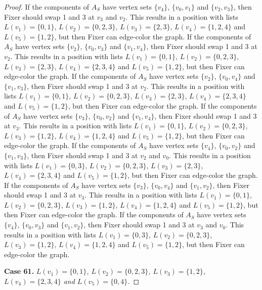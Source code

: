\documentclass[12pt]{amsart}
\theoremstyle{plain}
\theoremstyle{definition}
\theoremstyle{remark}
\begin{document}
\begin{proof}
If the components of $A_S$ have vertex sets $\{v_4\}$, $\{v_0, v_1\}$ and $\{v_2, v_3\}$, then Fixer should swap 1 and 3 at $v_3$ and $v_2$. This results in a position with lists $L(v_1) = \{0, 1\}$, $L(v_2) = \{0, 2, 3\}$, $L(v_3) = \{2, 3\}$, $L(v_4) = \{1, 2, 4\}$ and $L(v_5) = \{1, 2\}$, but then Fixer can edge-color the graph.
If the components of $A_S$ have vertex sets $\{v_2\}$, $\{v_0, v_3\}$ and $\{v_1, v_4\}$, then Fixer should swap 1 and 3 at $v_2$. This results in a position with lists $L(v_1) = \{0, 1\}$, $L(v_2) = \{0, 2, 3\}$, $L(v_3) = \{2, 3\}$, $L(v_4) = \{2, 3, 4\}$ and $L(v_5) = \{1, 2\}$, but then Fixer can edge-color the graph.
If the components of $A_S$ have vertex sets $\{v_2\}$, $\{v_0, v_4\}$ and $\{v_1, v_3\}$, then Fixer should swap 1 and 3 at $v_2$. This results in a position with lists $L(v_1) = \{0, 1\}$, $L(v_2) = \{0, 2, 3\}$, $L(v_3) = \{2, 3\}$, $L(v_4) = \{2, 3, 4\}$ and $L(v_5) = \{1, 2\}$, but then Fixer can edge-color the graph.
If the components of $A_S$ have vertex sets $\{v_3\}$, $\{v_0, v_2\}$ and $\{v_1, v_4\}$, then Fixer should swap 1 and 3 at $v_3$. This results in a position with lists $L(v_1) = \{0, 1\}$, $L(v_2) = \{0, 2, 3\}$, $L(v_3) = \{1, 2\}$, $L(v_4) = \{1, 2, 4\}$ and $L(v_5) = \{1, 2\}$, but then Fixer can edge-color the graph.
If the components of $A_S$ have vertex sets $\{v_4\}$, $\{v_0, v_2\}$ and $\{v_1, v_3\}$, then Fixer should swap 1 and 3 at $v_2$ and $v_0$. This results in a position with lists $L(v_1) = \{0, 3\}$, $L(v_2) = \{0, 2, 3\}$, $L(v_3) = \{2, 3\}$, $L(v_4) = \{2, 3, 4\}$ and $L(v_5) = \{1, 2\}$, but then Fixer can edge-color the graph.
If the components of $A_S$ have vertex sets $\{v_3\}$, $\{v_0, v_4\}$ and $\{v_1, v_2\}$, then Fixer should swap 1 and 3 at $v_3$. This results in a position with lists $L(v_1) = \{0, 1\}$, $L(v_2) = \{0, 2, 3\}$, $L(v_3) = \{1, 2\}$, $L(v_4) = \{1, 2, 4\}$ and $L(v_5) = \{1, 2\}$, but then Fixer can edge-color the graph.
If the components of $A_S$ have vertex sets $\{v_4\}$, $\{v_0, v_3\}$ and $\{v_1, v_2\}$, then Fixer should swap 1 and 3 at $v_3$ and $v_0$. This results in a position with lists $L(v_1) = \{0, 3\}$, $L(v_2) = \{0, 2, 3\}$, $L(v_3) = \{1, 2\}$, $L(v_4) = \{1, 2, 4\}$ and $L(v_5) = \{1, 2\}$, but then Fixer can edge-color the graph.

\noindent\textbf{Case 61.  }\textit{$L(v_1) = \{0, 1\}$, $L(v_2) = \{0, 2, 3\}$, $L(v_3) = \{1, 2\}$, $L(v_4) = \{2, 3, 4\}$ and $L(v_5) = \{0, 4\}$.}


\end{proof}
\end{document}
